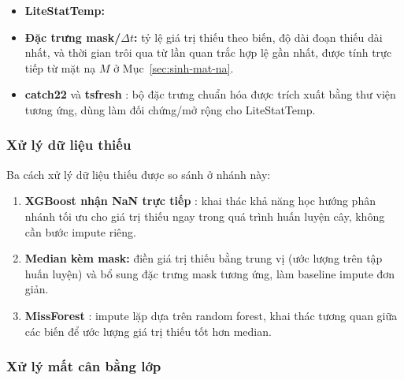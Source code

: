 \begin{itemize}
  \item \textbf{LiteStatTemp:} 
  \item \textbf{Đặc trưng mask/$\Delta t$:} tỷ lệ giá trị thiếu theo biến, độ dài đoạn
        thiếu dài nhất, và thời gian trôi qua từ lần quan trắc hợp lệ gần nhất, được tính
        trực tiếp từ mặt nạ $M$ ở Mục~\ref{sec:sinh-mat-na}.
  \item \textbf{catch22} \cite{lubba2019catch22} và \textbf{tsfresh} \cite{christ2018tsfresh}:
        bộ đặc trưng chuẩn hóa được trích xuất bằng thư viện tương ứng, dùng làm đối
        chứng/mở rộng cho LiteStatTemp.
\end{itemize}

\subsubsection{Xử lý dữ liệu thiếu}
\label{sec:xu-ly-thieu-classic-ml}

Ba cách xử lý dữ liệu thiếu được so sánh ở nhánh này:

\begin{enumerate}
  \item \textbf{XGBoost nhận NaN trực tiếp} \cite{chen2016xgboost}: khai thác khả năng
        học hướng phân nhánh tối ưu cho giá trị thiếu ngay trong quá trình huấn luyện
        cây, không cần bước impute riêng.
  \item \textbf{Median kèm mask:} điền giá trị thiếu bằng trung vị (ước lượng trên tập
        huấn luyện) và bổ sung đặc trưng mask tương ứng, làm baseline impute đơn giản.
  \item \textbf{MissForest} \cite{stekhoven2012missforest}: impute lặp dựa trên random
        forest, khai thác tương quan giữa các biến để ước lượng giá trị thiếu tốt hơn
        median.
\end{enumerate}

\subsubsection{Xử lý mất cân bằng lớp}
\label{sec:mat-can-bang-lop-classic}


